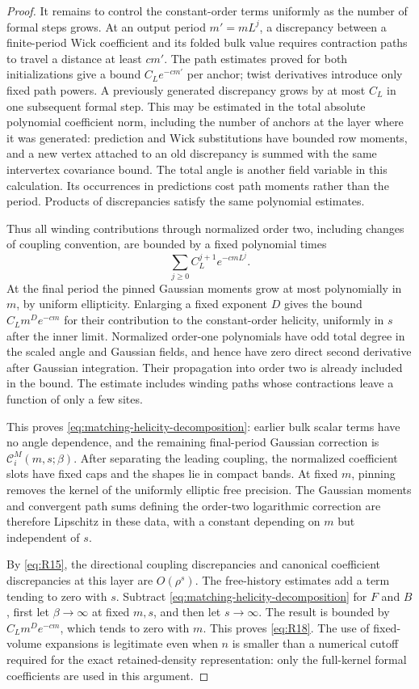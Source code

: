 \begin{proof}
It remains to control the constant-order terms uniformly as the number of
formal steps grows. At an output period $m'=mL^j$, a discrepancy between a
finite-period Wick coefficient and its folded bulk value requires
contraction paths to travel a distance at least $cm'$. The path estimates
proved for both initializations give a bound $C_Le^{-cm'}$ per anchor;
twist derivatives introduce only fixed path powers. A previously generated
discrepancy grows by at most $C_L$ in one subsequent formal step. This may
be estimated in the total absolute polynomial coefficient norm, including
the number of anchors at the layer where it was generated: prediction and
Wick substitutions have bounded row moments, and a new vertex attached to
an old discrepancy is summed with the same intervertex covariance bound.
The total angle is another field variable in this calculation. Its
occurrences in predictions cost path moments rather than the period.
Products of discrepancies satisfy the same polynomial estimates.

Thus all winding contributions through normalized order two, including
changes of coupling convention, are bounded by a fixed polynomial times
\[
 \sum_{j\ge0}C_L^{j+1}e^{-cmL^j}.
\]
At the final period the pinned Gaussian moments grow at most polynomially
in $m$, by uniform ellipticity. Enlarging a fixed exponent $D$ gives the
bound $C_Lm^D e^{-cm}$ for their contribution to the constant-order
helicity, uniformly in $s$ after the inner limit. Normalized order-one
polynomials have odd total degree in the scaled angle and Gaussian
fields, and hence have zero direct second derivative after Gaussian
integration. Their propagation into order two is already included in the
bound. The estimate includes winding paths whose contractions leave a
function of only a few sites.

This proves \eqref{eq:matching-helicity-decomposition}: earlier bulk
scalar terms have no angle dependence, and the remaining final-period
Gaussian correction is $\mathcal C_i^M(m,s;\beta)$. After separating the
leading coupling, the normalized coefficient slots have fixed caps and
the shapes lie in compact bands. At fixed $m$, pinning removes the kernel
of the uniformly elliptic free precision. The Gaussian moments and
convergent path sums defining the order-two logarithmic correction are
therefore Lipschitz in these data, with a constant depending on $m$ but
independent of $s$.

By \eqref{eq:R15}, the directional coupling discrepancies and canonical
coefficient discrepancies at this layer are $O(\rho^s)$. The free-history
estimates add a term tending to zero with $s$. Subtract
\eqref{eq:matching-helicity-decomposition} for $F$ and $B$, first let
$\beta\to\infty$ at fixed $m,s$, and then let $s\to\infty$. The result
is bounded by $C_Lm^D e^{-cm}$, which tends to zero with $m$. This proves
\eqref{eq:R18}. The use of fixed-volume expansions is legitimate even
when $n$ is smaller than a numerical cutoff required for the exact
retained-density representation: only the full-kernel formal coefficients
are used in this argument.
\end{proof}

